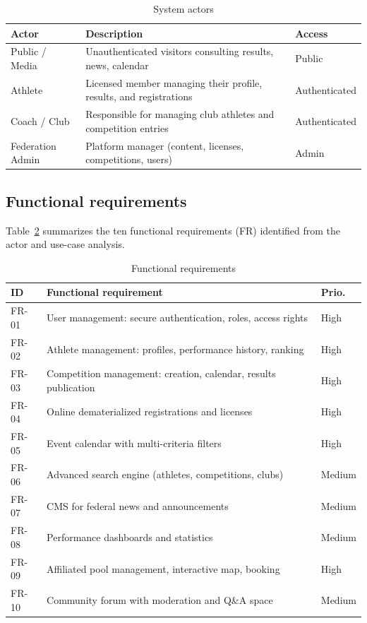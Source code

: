 \documentclass[conference]{IEEEtran}
\begin{document}
\begin{table}[h]
\caption{System actors}
\label{tab:actors}
\centering
\begin{tabular}{p{1.6cm}p{4.8cm}p{1.3cm}}
\toprule
\textbf{Actor} & \textbf{Description} & \textbf{Access} \\
\midrule
Public / Media & Unauthenticated visitors consulting results, news, calendar & Public \\
Athlete & Licensed member managing their profile, results, and registrations & Authenticated \\
Coach / Club & Responsible for managing club athletes and competition entries & Authenticated \\
Federation Admin & Platform manager (content, licenses, competitions, users) & Admin \\
\bottomrule
\end{tabular}
\end{table}

\subsection{Functional requirements}
Table~\ref{tab:fr} summarizes the ten functional requirements (FR) identified from the actor and use-case analysis.

\begin{table}[h]
\caption{Functional requirements}
\label{tab:fr}
\centering
\begin{tabular}{p{0.5cm}p{6cm}p{0.9cm}}
\toprule
\textbf{ID} & \textbf{Functional requirement} & \textbf{Prio.} \\
\midrule
FR-01 & User management: secure authentication, roles, access rights & High \\
FR-02 & Athlete management: profiles, performance history, ranking & High \\
FR-03 & Competition management: creation, calendar, results publication & High \\
FR-04 & Online dematerialized registrations and licenses & High \\
FR-05 & Event calendar with multi-criteria filters & High \\
FR-06 & Advanced search engine (athletes, competitions, clubs) & Medium \\
FR-07 & CMS for federal news and announcements & Medium \\
FR-08 & Performance dashboards and statistics & Medium \\
FR-09 & Affiliated pool management, interactive map, booking & High \\
FR-10 & Community forum with moderation and Q\&A space & Medium \\
\bottomrule
\end{tabular}
\end{table}
\end{document}

